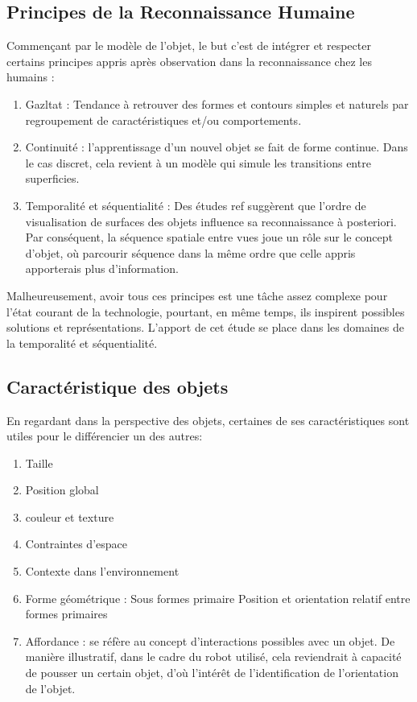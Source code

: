 {\color {green}
\subsection {Principes de la Reconnaissance Humaine}

Commençant par le modèle de l'objet, le but c'est de intégrer et
respecter certains principes appris après observation dans la
reconnaissance chez les humains :

\begin{enumerate}
\item Gazltat : Tendance à retrouver des formes et contours simples et
naturels par regroupement de caractéristiques et/ou comportements.

\item Continuité : l'apprentissage d'un nouvel objet se fait de forme
continue. Dans le cas discret, cela revient à un modèle qui simule les
transitions entre superficies.

\item Temporalité et séquentialité : Des études {\color{blue} ref} suggèrent que l'ordre
de visualisation de surfaces des objets influence sa reconnaissance à
posteriori. Par conséquent, la séquence spatiale entre vues joue un rôle sur le concept d'objet, où parcourir
séquence dans la même ordre que celle appris apporterais plus d'information.

\end{enumerate}

Malheureusement, avoir tous ces principes est une tâche assez complexe
pour l’état courant de la technologie, pourtant, en même temps, ils inspirent
possibles solutions et représentations. L'apport de cet étude se place dans les
domaines de la temporalité et séquentialité.

\subsection{Caractéristique des objets} 

En regardant dans la perspective des objets, certaines de ses caractéristiques sont utiles pour le différencier un des autres:

\begin {enumerate}
\item Taille
\item Position global
\item couleur et texture
\item Contraintes d’espace
\item Contexte dans l'environnement
\item Forme géométrique : 
\subitem Sous formes primaire 
\subitem Position et orientation relatif entre formes primaires
\item Affordance : se réfère au concept d’interactions possibles
avec un objet. De manière illustratif, dans le cadre du robot utilisé,
cela reviendrait à capacité de pousser un certain objet, d’où
l’intérêt de l’identification de l’orientation de l’objet.
\end{enumerate} 
}

